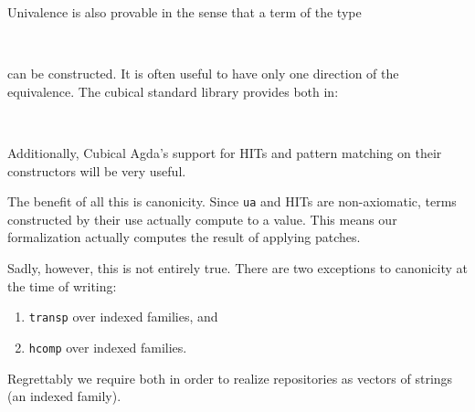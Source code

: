 Univalence is also provable in the sense that a term of the type
\begin{code}[hide]%
\>[0]\<%
\\
\>[0][@{}l@{\AgdaIndent{0}}]%
\>[2]\AgdaSpace{}%
\AgdaSymbol{:}\<%
\end{code}
\begin{code}%
\>[2][@{}l@{\AgdaIndent{1}}]%
\>[4]\AgdaSymbol{\{}\AgdaSpace{}%
\AgdaSpace{}%
\AgdaSymbol{:}\AgdaSpace{}%
\AgdaSymbol{\}}\AgdaSpace{}%
\AgdaSpace{}%
\AgdaSymbol{(}\AgdaSpace{}%
\AgdaSpace{}%
\AgdaSymbol{)}\AgdaSpace{}%
\AgdaSpace{}%
\AgdaSymbol{(}\AgdaSpace{}%
\AgdaSpace{}%
\AgdaSymbol{)}\<%
\end{code}
can be constructed.
It is often useful to have only one direction of the equivalence.
The cubical standard library provides both in:
\begin{code}%
%
\>[2]%
\>[14]\AgdaSymbol{:}\AgdaSpace{}%
\AgdaSymbol{\{}\AgdaSpace{}%
\AgdaSpace{}%
\AgdaSymbol{:}\AgdaSpace{}%
\AgdaSymbol{\}}\AgdaSpace{}%
\AgdaSpace{}%
\AgdaSpace{}%
\AgdaSpace{}%
\AgdaSpace{}%
\AgdaSpace{}%
\AgdaSpace{}%
\AgdaSpace{}%
\<%
\\
%
\>[2]\AgdaSpace{}%
\AgdaSymbol{:}\AgdaSpace{}%
\AgdaSymbol{\{}\AgdaSpace{}%
\AgdaSpace{}%
\AgdaSymbol{:}\AgdaSpace{}%
\AgdaSymbol{\}}\AgdaSpace{}%
\AgdaSpace{}%
\AgdaSpace{}%
\AgdaSpace{}%
\AgdaSpace{}%
\AgdaSpace{}%
\AgdaSpace{}%
\AgdaSpace{}%
\<%
\end{code}

Additionally, Cubical Agda's support for HITs and pattern matching on their
constructors will be very useful.

The benefit of all this is canonicity. Since \texttt{ua} and HITs are non-axiomatic,
terms constructed by their use actually compute to a value. This means our
formalization actually computes the result of applying patches.

Sadly, however, this is not entirely true.
There are two exceptions to canonicity at the time of writing:
\begin{enumerate}
  \item \texttt{transp} over indexed families, and
  \item \texttt{hcomp} over indexed families.
\end{enumerate}

Regrettably we require both in order to realize repositories as vectors of strings
(an indexed family).
